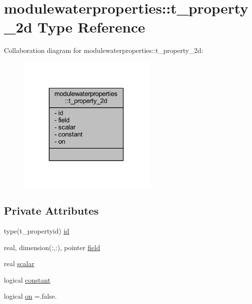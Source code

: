 \hypertarget{structmodulewaterproperties_1_1t__property__2d}{}\section{modulewaterproperties\+:\+:t\+\_\+property\+\_\+2d Type Reference}
\label{structmodulewaterproperties_1_1t__property__2d}


Collaboration diagram for modulewaterproperties\+:\+:t\+\_\+property\+\_\+2d\+:\nopagebreak
\begin{figure}[H]
\begin{center}
\leavevmode
\includegraphics[width=194pt]{structmodulewaterproperties_1_1t__property__2d__coll__graph}
\end{center}
\end{figure}
\subsection*{Private Attributes}
\begin{DoxyCompactItemize}
\item 
type(t\+\_\+propertyid) \mbox{\hyperlink{structmodulewaterproperties_1_1t__property__2d_a63c359a66465f502f30249e64620cd1a}{id}}
\item 
real, dimension(\+:,\+:), pointer \mbox{\hyperlink{structmodulewaterproperties_1_1t__property__2d_aa1875a22ace60b8df2ac3af7fda1a77c}{field}}
\item 
real \mbox{\hyperlink{structmodulewaterproperties_1_1t__property__2d_ac452ed254ac4ce8c35a6fc227d3042b6}{scalar}}
\item 
logical \mbox{\hyperlink{structmodulewaterproperties_1_1t__property__2d_a5ea04597e7b06d7a67fc3effeec7e55d}{constant}}
\item 
logical \mbox{\hyperlink{structmodulewaterproperties_1_1t__property__2d_ad4c981a1f4356e3df413f1e52f2fa01b}{on}} =.false.
\end{DoxyCompactItemize}


